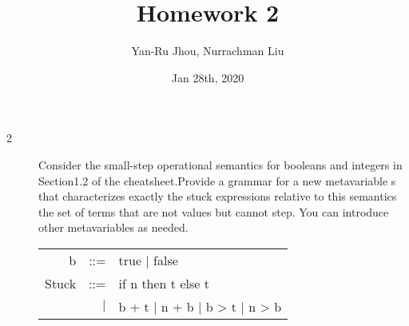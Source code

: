 \documentclass{article}
\title{Homework 2}
\author{Yan-Ru Jhou, Nurrachman Liu}
\date{Jan 28th, 2020}
\newcommand{\step}[2]{{\tt #1} $\longrightarrow$ {\tt #2}}
\newcommand{\inferrule}[3]{\infrule[#1]{\mbox{#2}}{\mbox{#3}}}
\newcommand{\inferax}[2]{\infrule[#1]{\mbox{}}{\mbox{#2}}}
\begin{document}
    \maketitle

    \begin{description}
        \item[2]{Consider the small-step operational semantics for booleans and integers in Section1.2 of the cheatsheet.Provide a grammar for a new metavariable s that characterizes exactly the stuck expressions relative to this semantics the set of terms that are not values but cannot step. You can introduce other metavariables as needed.}\\
            \begin{tt}
                    \begin{tabular}{rrl}
                        b & ::= & true $\mid$ false \\
                        Stuck & ::= & if n then t else t \\
                        &$\mid$& b + t $\mid$ n + b $\mid$ b > t $\mid$ n > b\\
                    \end{tabular}
            \end{tt}
%
%
%
%
%
%

\end{description}
\end{document}
